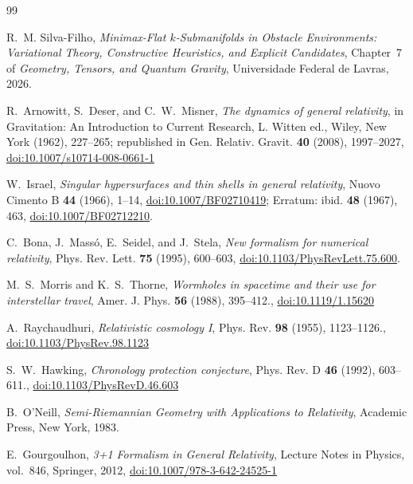 \documentclass[11pt,reqno]{amsart}
\theoremstyle{definition}
\numberwithin{equation}{section}
\begin{document}
\begingroup\raggedright
\begin{thebibliography}{99}

 R.~M. Silva-Filho, \emph{Minimax-Flat $k$-Submanifolds in Obstacle Environments: Variational Theory, Constructive Heuristics, and Explicit Candidates}, Chapter~7 of \emph{Geometry, Tensors, and Quantum Gravity}, Universidade Federal de Lavras, 2026.

R.~Arnowitt, S.~Deser, and C.~W.~Misner,
\emph{The dynamics of general relativity},
in Gravitation: An Introduction to Current Research, L. Witten ed., Wiley, New York (1962), 227--265; republished in Gen. Relativ. Gravit. \textbf{40} (2008), 1997--2027, \href{https://doi.org/10.1007/s10714-008-0661-1}{doi:10.1007/s10714-008-0661-1}

W.~Israel,
\emph{Singular hypersurfaces and thin shells in general relativity},
Nuovo Cimento B \textbf{44} (1966), 1--14, \href{https://doi.org/10.1007/BF02710419}{doi:10.1007/BF02710419};
Erratum: ibid. \textbf{48} (1967), 463, \href{https://doi.org/10.1007/BF02712210}{doi:10.1007/BF02712210}.

C.~Bona, J.~Mass\'o, E.~Seidel, and J.~Stela,
\emph{New formalism for numerical relativity},
Phys. Rev. Lett. \textbf{75} (1995), 600--603, \href{https://doi.org/10.1103/PhysRevLett.75.600}{doi:10.1103/PhysRevLett.75.600}.

M.~S.~Morris and K.~S.~Thorne,
\emph{Wormholes in spacetime and their use for interstellar travel},
Amer. J. Phys. \textbf{56} (1988), 395--412., \href{https://doi.org/10.1119/1.15620}{doi:10.1119/1.15620}

A.~Raychaudhuri,
\emph{Relativistic cosmology I},
Phys. Rev. \textbf{98} (1955), 1123--1126., \href{https://doi.org/10.1103/PhysRev.98.1123}{doi:10.1103/PhysRev.98.1123}

S.~W.~Hawking,
\emph{Chronology protection conjecture},
Phys. Rev. D \textbf{46} (1992), 603--611., \href{https://doi.org/10.1103/PhysRevD.46.603}{doi:10.1103/PhysRevD.46.603}

B.~O'Neill,
\emph{Semi-Riemannian Geometry with Applications to Relativity},
Academic Press, New York, 1983.

E.~Gourgoulhon,
\emph{3+1 Formalism in General Relativity},
Lecture Notes in Physics, vol.~846, Springer, 2012, \href{https://doi.org/10.1007/978-3-642-24525-1}{doi:10.1007/978-3-642-24525-1}


\end{thebibliography}
\end{document}
